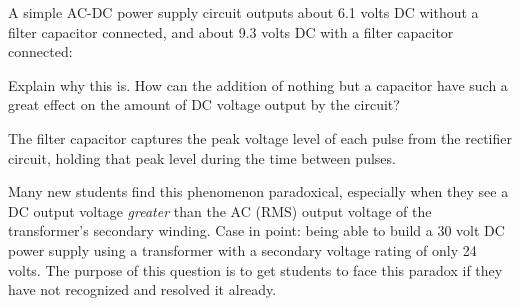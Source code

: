 

A simple AC-DC power supply circuit outputs about 6.1 volts DC without a filter capacitor connected, and about 9.3 volts DC with a filter capacitor connected:

\vskip 10pt

Explain why this is.  How can the addition of nothing but a capacitor have such a great effect on the amount of DC voltage output by the circuit?







The filter capacitor captures the peak voltage level of each pulse from the rectifier circuit, holding that peak level during the time between pulses.  







Many new students find this phenomenon paradoxical, especially when they see a DC output voltage {\it greater} than the AC (RMS) output voltage of the transformer's secondary winding.  Case in point: being able to build a 30 volt DC power supply using a transformer with a secondary voltage rating of only 24 volts.  The purpose of this question is to get students to face this paradox if they have not recognized and resolved it already.




